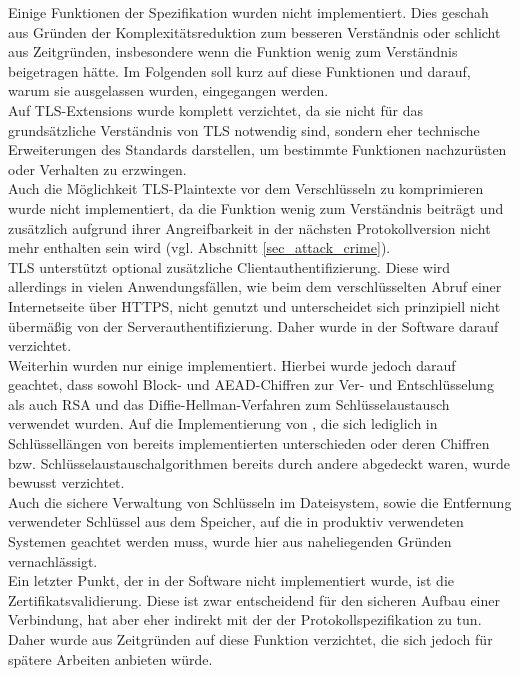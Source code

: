 Einige Funktionen der Spezifikation wurden nicht implementiert. Dies geschah aus Gründen der Komplexitätsreduktion zum besseren Verständnis oder schlicht aus Zeitgründen, insbesondere wenn die Funktion wenig zum Verständnis beigetragen hätte. Im Folgenden soll kurz auf diese Funktionen und darauf, warum sie ausgelassen wurden, eingegangen werden.\\
Auf TLS-Extensions wurde komplett verzichtet, da sie nicht für das grundsätzliche Verständnis von TLS notwendig sind, sondern eher technische Erweiterungen des Standards darstellen, um bestimmte Funktionen nachzurüsten oder Verhalten zu erzwingen.\\
Auch die Möglichkeit TLS-Plaintexte vor dem Verschlüsseln zu komprimieren wurde nicht implementiert, da die Funktion wenig zum Verständnis beiträgt und zusätzlich aufgrund ihrer Angreifbarkeit in der nächsten Protokollversion nicht mehr enthalten sein wird (vgl. Abschnitt \ref{sec_attack_crime}).\\
TLS unterstützt optional zusätzliche Clientauthentifizierung. Diese wird allerdings in vielen Anwendungsfällen, wie beim dem verschlüsselten Abruf einer Internetseite über HTTPS, nicht genutzt und unterscheidet sich prinzipiell nicht übermäßig von der Serverauthentifizierung. Daher wurde in der Software darauf verzichtet.\\
Weiterhin wurden nur einige \ciphersuites implementiert. Hierbei wurde jedoch darauf geachtet, dass sowohl Block- und AEAD-Chiffren zur Ver- und Entschlüsselung als auch RSA und das Diffie-Hellman-Verfahren zum Schlüsselaustausch verwendet wurden. Auf die Implementierung von \ciphersuites, die sich lediglich in Schlüssellängen von bereits implementierten \ciphersuites unterschieden oder deren Chiffren bzw. Schlüsselaustauschalgorithmen bereits durch andere \ciphersuites abgedeckt waren, wurde bewusst verzichtet.\\
Auch die sichere Verwaltung von Schlüsseln im Dateisystem, sowie die Entfernung verwendeter Schlüssel aus dem Speicher, auf die in produktiv verwendeten Systemen geachtet werden muss, wurde hier aus naheliegenden Gründen vernachlässigt.\\
Ein letzter Punkt, der in der Software nicht implementiert wurde, ist die Zertifikatsvalidierung. Diese ist zwar entscheidend für den sicheren Aufbau einer Verbindung, hat aber eher indirekt mit der der Protokollspezifikation zu tun. Daher wurde aus Zeitgründen auf diese Funktion verzichtet, die sich jedoch für spätere Arbeiten anbieten würde.

